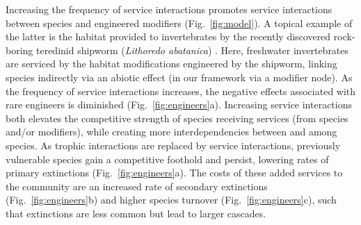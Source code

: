 \documentclass[twocolumn,preprintnumbers,amsmath,amssymb,superscriptaddress,linenumbers]{revtex4-1}
\begin{document}
Increasing the frequency of service interactions promotes service interactions between species and engineered modifiers (Fig.\ \ref{fig:model}).
A topical example of the latter is the habitat provided to invertebrates by the recently discovered rock-boring teredinid shipworm (\emph{Lithoredo abatanica}) \cite{Shipway2019}.
Here, freshwater invertebrates are serviced by the habitat modifications engineered by the shipworm, linking species indirectly via an abiotic effect (in our framework via a modifier node).
As the frequency of service interactions increases, the negative effects associated with rare engineers is diminished (Fig.\ \ref{fig:engineers}a).
Increasing service interactions both elevates the competitive strength of species receiving services (from species and/or modifiers), while creating more interdependencies between and among species.
As trophic interactions are replaced by service interactions, previously vulnerable species gain a competitive foothold and persist, lowering rates of primary extinctions (Fig.\ \ref{fig:engineers}a). %
The costs of these added services to the community are an increased rate of secondary extinctions (Fig.\ \ref{fig:engineers}b) and higher species turnover (Fig.\ \ref{fig:engineers}c), such that extinctions are less common but lead to larger cascades.



\end{document}
